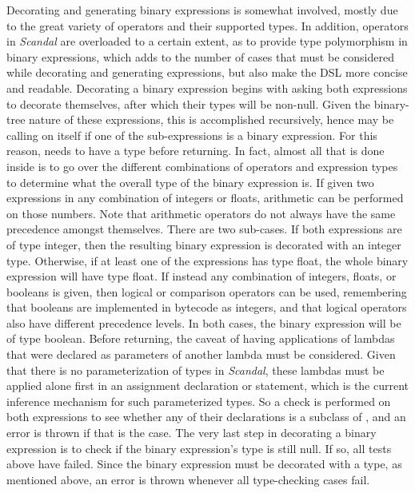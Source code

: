 Decorating and generating binary expressions is somewhat involved, mostly due to the great variety of operators and their supported types. In addition, operators in \emph{Scandal} are overloaded to a certain extent, as to provide type polymorphism in binary expressions, which adds to the number of cases that must be considered while decorating and generating expressions, but also make the DSL more concise and readable. Decorating a binary expression begins with asking both expressions to decorate themselves, after which their types will be non-null. Given the binary-tree nature of these expressions, this is accomplished recursively, hence  may be calling on itself if one of the sub-expressions is a binary expression. For this reason,  needs to have a type before returning. In fact, almost all that is done inside  is to go over the different combinations of operators and expression types to determine what the overall type of the binary expression is. If given two expressions in any combination of integers or floats, arithmetic can be performed on those numbers. Note that arithmetic operators do not always have the same precedence amongst themselves. There are two sub-cases. If both expressions are of type integer, then the resulting binary expression is decorated with an integer type. Otherwise, if at least one of the expressions has type float, the whole binary expression will have type float. If instead any combination of integers, floats, or booleans is given, then logical or comparison operators can be used, remembering that booleans are implemented in bytecode as integers, and that logical operators also have different precedence levels. In both cases, the binary expression will be of type boolean. Before returning, the caveat of having applications of lambdas that were declared as parameters of another lambda must be considered. Given that there is no parameterization of types in \emph{Scandal}, these lambdas must be applied alone first in an assignment declaration or statement, which is the current inference mechanism for such parameterized types. So a check is performed on both expressions to see whether any of their declarations is a subclass of , and an error is thrown if that is the case. The very last step in decorating a binary expression is to check if the binary expression's type is still null. If so, all tests above have failed. Since the binary expression must be decorated with a type, as mentioned above, an error is thrown whenever all type-checking cases fail.


